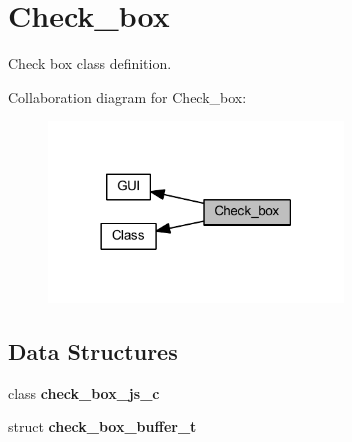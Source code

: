\section{Check\+\_\+box}
\label{group___check__box}


Check box class definition.  


Collaboration diagram for Check\+\_\+box\+:\nopagebreak
\begin{figure}[H]
\begin{center}
\leavevmode
\includegraphics[width=222pt]{group___check__box}
\end{center}
\end{figure}
\subsection*{Data Structures}
\begin{DoxyCompactItemize}
\item 
class \textbf{ check\+\_\+box\+\_\+js\+\_\+c}
\item 
struct \textbf{ check\+\_\+box\+\_\+buffer\+\_\+t}
\end{DoxyCompactItemize}
